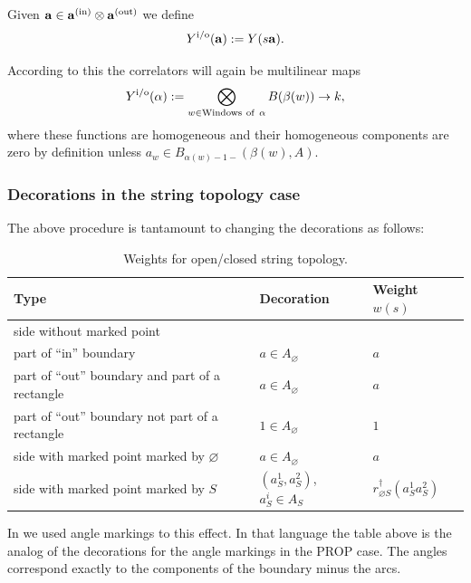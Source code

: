 \documentclass[pdftex]{sigma}
\def\ba{\mathbf{a}}
\begin{document}
Given $\ba\in \ba^{\rm (in)}\otimes \ba^{\rm (out)}$ we def\/ine
\begin{equation*}
Y^{\rm i/o}(\ba):=Y(s\ba).
\end{equation*}

 According to this the correlators
will again be multilinear maps
\begin{equation*}
Y^{\rm i/o}(\alpha):= \bigotimes_{w \in \mathrm {Windows~of~}\alpha}B(\beta(w))\to k,
\end{equation*}
where these functions are homogeneous and their homogeneous components  are  zero by def\/inition unless
$a_w\in B_{\alpha(w)-1-}(\beta(w),A) $.

\subsubsection{Decorations in the string topology case}

The above procedure  is tantamount to changing the decorations as follows:

\vspace{-1mm}

\begin{table}[h]\centering \caption{Weights for open/closed string topology.}
\vspace{1mm}

\begin{tabular}{lll}
Type&Decoration& Weight $w(s)$\\
\hline
side without marked point\tsep{1pt}\\
\quad  part of ``in'' boundary&$a\in A_{\varnothing}$&$a$\\
\quad part of ``out''  boundary and part of a rectangle&$a\in A_{\varnothing}$&$a$\\
 \quad part of ``out''  boundary not part of a rectangle&$1\in A_{\varnothing}$&$1$\\
side with marked point marked by $\varnothing$&$a\in A_{\varnothing}$&$a$\\
side with marked point marked by $S$&$(a_S^1,a_S^2)$, $a_S^i\in A_{S}$&
$r^{\dagger}_{\varnothing S}(a_S^1 a_S^2)$
\end{tabular}\vspace{-1mm}
\end{table}

In \cite{hoch2} we used angle markings to this ef\/fect. In that language
the table above is the analog of the decorations for the
angle markings in the PROP case. The angles correspond exactly to the
components of the boundary minus the arcs.
\end{document}
